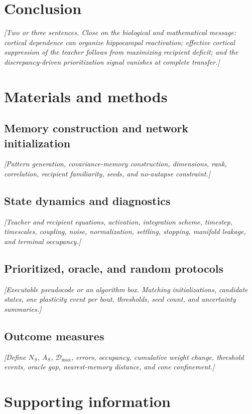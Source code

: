 \documentclass[10pt,letterpaper]{article}
\theoremstyle{plain}
\theoremstyle{remark}
\begin{document}
\section{Conclusion}
\textit{[Two or three sentences. Close on the biological and mathematical message: cortical dependence can organize hippocampal reactivation; effective cortical suppression of the teacher follows from maximizing recipient deficit; and the discrepancy-driven prioritization signal vanishes at complete transfer.]}

\section{Materials and methods}

\subsection{Memory construction and network initialization}
\textit{[Pattern generation, covariance-memory construction, dimensions, rank, correlation, recipient familiarity, seeds, and no-autapse constraint.]}

\subsection{State dynamics and diagnostics}
\textit{[Teacher and recipient equations, activation, integration scheme, timestep, timescales, coupling, noise, normalization, settling, stopping, manifold leakage, and terminal occupancy.]}

\subsection{Prioritized, oracle, and random protocols}
\textit{[Executable pseudocode or an algorithm box. Matching initializations, candidate states, one plasticity event per bout, thresholds, seed count, and uncertainty summaries.]}

\subsection{Outcome measures}
\textit{[Define $N_S$, $A_S$, $\mathcal D_{\max}$, errors, occupancy, cumulative weight change, threshold events, oracle gap, nearest-memory distance, and cone confinement.]}

\section*{Supporting information}
\end{document}
